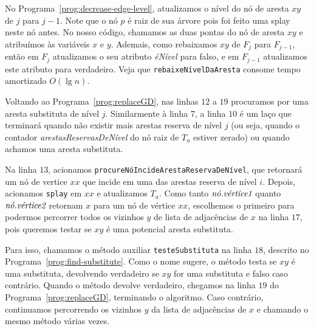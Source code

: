 No Programa~\ref{prog:decrease-edge-level}, atualizamos o nível do nó de aresta $xy$ de $j$ para $j-1$. Note que o nó $p$ é raiz de sua árvore pois foi feito uma splay neste nó antes. No nosso código, chamamos as duas pontas do nó de aresta $xy$ e atribuímos às variáveis $x$ e $y$. Ademais, como rebaixamos $xy$ de $F_j$ para $F_{j - 1}$, então em $F_j$ atualizamos o seu atributo \textit{éNível} para falso, e em $F_{j-1}$ atualizamos este atributo para verdadeiro. Veja que \texttt{rebaixeNívelDaAresta} consome tempo amortizado $O(\lg n)$.

Voltando ao Programa~\ref{prog:replaceGD}, nas linhas $12$ a $19$ procuramos por uma aresta substituta de nível $j$. Similarmente à linha $7$, a linha $10$ é um laço que terminará quando não existir mais arestas reserva de nível $j$ (ou seja, quando o contador \textit{arestasReservasDeNível} do nó raiz de $T_u$ estiver zerado) ou quando achamos uma aresta substituta.  

Na linha $13$, acionamos \texttt{procureNóIncideArestaReservaDeNível}, que retornará um nó de vertice $xx$ que incide em uma das arestas reserva de nível $i$. Depois, acionamos \texttt{splay} em $xx$ e atualizamos $T_u$. Como tanto $\emph{nó.vértice1}$ quanto $\emph{nó.vértice2}$ retornam $x$ para um nó de vértice $xx$, escolhemos o primeiro para podermos percorrer todos os vizinhos $y$ de lista de adjacências de $x$ na linha $17$, pois queremos testar se $xy$ é uma potencial aresta substituta.

Para isso, chamamos o método auxiliar \texttt{testeSubstituta} na linha $18$, descrito no Programa~\ref{prog:find-substitute}. Como o nome sugere, o método testa se $xy$ é uma substituta, devolvendo verdadeiro se $xy$ for uma substituta e falso caso contrário. Quando o método devolve verdadeiro, chegamos na linha $19$ do Programa~\ref{prog:replaceGD}, terminando o algoritmo. Caso contrário, continuamos percorrendo os vizinhos $y$ da lista de adjacências de $x$ e chamando o mesmo método várias vezes.

